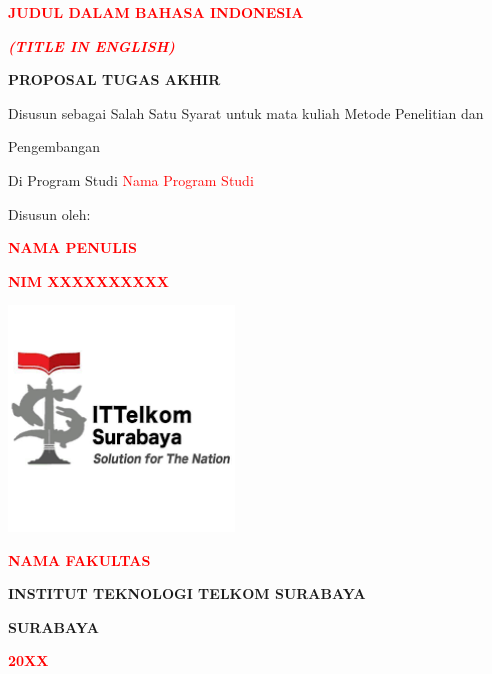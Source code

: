 \begin{center}
\begin{spacing}{1.5}

\textbf{\textcolor{red}{\Large JUDUL DALAM BAHASA INDONESIA}}

\vfill

\textit{\textbf{\textcolor{red}{\large (TITLE IN ENGLISH)}}}

\vfill

\textbf{\large PROPOSAL TUGAS AKHIR}

\normalsize Disusun sebagai Salah Satu Syarat untuk mata kuliah Metode Penelitian dan

\normalsize Pengembangan

\normalsize Di Program Studi \textcolor{red}{Nama Program Studi}

\vfill

\normalsize Disusun oleh:


\normalsize \textbf{\textcolor{red}{NAMA PENULIS}}

\normalsize \textbf{\textcolor{red}{NIM XXXXXXXXXX}}

\includegraphics[width=6cm, height=6cm]{images/logo-itts.png}

\vfill

\textbf{\textcolor{red}{\Large NAMA FAKULTAS}}

\vfill

\textbf{\Large INSTITUT TEKNOLOGI TELKOM SURABAYA}

\vfill

\textbf{\Large SURABAYA}

\vfill

\textbf{\textcolor{red}{\Large 20XX}}

\end{spacing}
\end{center}
